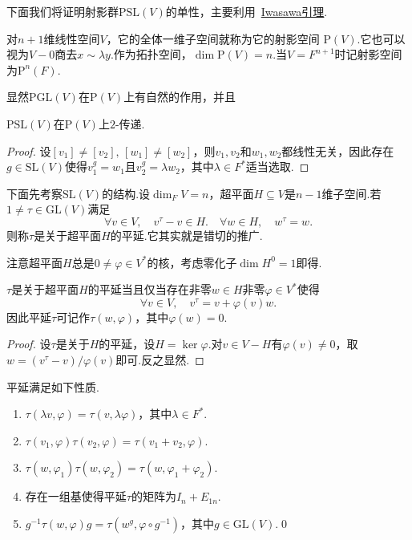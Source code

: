 \medskip 下面我们将证明射影群$\mathrm{PSL}(V)$的单性，主要利用~\hyperlink{lemma:Iwasawa}{Iwasawa引理}.

对$n+1$维线性空间$V$，它的全体一维子空间就称为它的{\heiti 射影空间} $\bm{\mathrm{P}}(V)$.它也可以视为$V-0$商去$x\sim\lambda y$.作为拓扑空间，$\dim\bm{\mathrm{P}}(V)=n$.当$V=F^{n+1}$时记射影空间为$\bm{\mathrm{P}}^n(F)$.

显然$\mathrm{PGL}(V)$在$\bm{\mathrm{P}}(V)$上有自然的作用，并且
\begin{prop}
	$\mathrm{PSL}(V)$在$\bm{\mathrm{P}}(V)$上$2$-传递.
\end{prop}
\begin{proof}
	设$[v_1]\ne[v_2],\,[w_1]\ne[w_2]$，则$v_1,v_2$和$w_1,w_2$都线性无关，因此存在$g\in\mathrm{SL}(V)$使得$v_1^g=w_1$且$v_2^g=\lambda w_2$，其中$\lambda\in F^*$适当选取.
\end{proof}

下面先考察$\mathrm{SL}(V)$的结构.设$\dim_FV=n$，超平面$H\subseteq V$是$n-1$维子空间.若$1\ne\tau\in\mathrm{GL}(V)$满足
\[
	\forall v\in V,\quad v^\tau-v\in H.\quad\forall w\in H,\quad w^\tau=w.
\]
则称$\tau$是关于超平面$H$的{\heiti 平延}.它其实就是错切的推广.

注意超平面$H$总是$0\ne\varphi\in V^*$的核，考虑零化子$\dim H^0=1$即得.

\begin{lemma}
	$\tau$是关于超平面$H$的平延当且仅当存在非零$w\in H$非零$\varphi\in V^*$使得
	\[
		\forall v\in V,\quad v^\tau=v+\varphi(v)w.
	\]
	因此平延$\tau$可记作$\tau(w,\varphi)$，其中$\varphi(w)=0$.
\end{lemma}
\begin{proof}
	设$\tau$是关于$H$的平延，设$H=\ker\varphi$.对$v\in V-H$有$\varphi(v)\ne 0$，取$w=(v^\tau-v)/\varphi(v)$即可.反之显然.
\end{proof}
\begin{lemma}
	平延满足如下性质\footnotemark .
	\begin{enumerate}
		\item $\tau(\lambda v,\varphi)=\tau(v,\lambda\varphi)$，其中$\lambda\in F^*$.
		\item $\tau(v_1,\varphi)\tau(v_2,\varphi)=\tau(v_1+v_2,\varphi)$.
		\item $\tau(w,\varphi_1)\tau(w,\varphi_2)=\tau(w,\varphi_1+\varphi_2)$.
		\item 存在一组基使得平延$\tau$的矩阵为$I_n+E_{1n}$.
		\item $g^{-1}\tau(w,\varphi)g=\tau(w^g,\varphi\circ g^{-1})$，其中$g\in\mathrm{GL}(V)$.\qed
	\end{enumerate}
\end{lemma}

